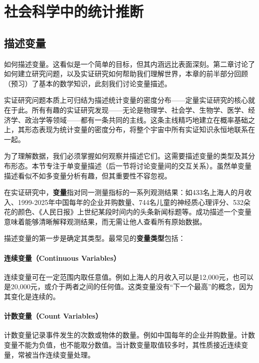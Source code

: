 \section{社会科学中的统计推断}

\subsection{描述变量}

如何描述变量。这看似是一个简单的目标，但其内涵远比表面深刻。第二章讨论了如何建立研究问题，以及实证研究如何帮助我们理解世界，本章的前半部分回顾（预习）了基本的数学知识，此刻我们讨论变量描述。

实证研究问题本质上可归结为描述统计变量的密度分布——定量实证研究的核心就在于此。所有有趣的实证研究发现——无论是物理学、社会学、生物学、医学、经济学、政治学等领域——都有一条共同的主线。这条主线精巧地建立在概率基础之上，其形态表现为统计变量的密度分布，将整个宇宙中所有实证知识永恒地联系在一起。

为了理解数据，我们必须掌握如何观察并描述它们。这需要描述变量的类型及其分布形态。本节专注于单变量描述（后一节将讨论变量间的交互关系）。虽然单变量描述看似不如多变量分析有趣，但其重要性不容忽视。

在实证研究中，\textbf{变量}指对同一测量指标的一系列观测结果：如433名上海人的月收入、1999-2025年中国每年的企业并购数量、744名儿童的神经质心理评分、532朵花的颜色、《人民日报》上世纪某段时间内的头条新闻标题等。成功描述一个变量意味着能够清晰解释观测结果，而无需让他人查看所有原始数据。

\begin{flushleft}
描述变量的第一步是确定其类型。最常见的\textbf{变量类型}包括：
\end{flushleft}

\paragraph*{连续变量（Continuous Variables）}
连续变量可在一定范围内取任意值。例如上海人的月收入可以是12,000元，也可以是20,000元，或介于两者之间的任何值。这类变量没有``下一个最高''的概念，因为其变化是连续的。

\paragraph*{计数变量（Count Variables）}
计数变量记录事件发生的次数或物体的数量。例如中国每年的企业并购数量。计数变量不能为负值，也不能取分数值。当计数变量取值较多时，其性质接近连续变量，常被当作连续变量处理。

